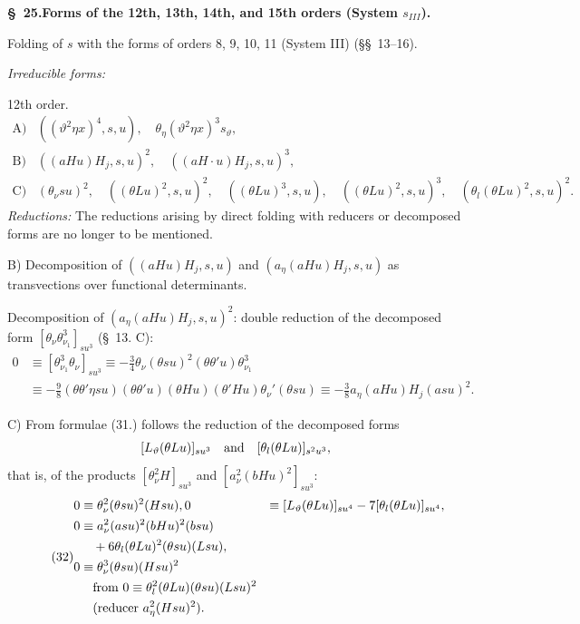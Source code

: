 \documentclass[11pt]{article}
\begin{document}
\begin{center}\textbf{\S\ 25.\quad Forms of the 12th, 13th, 14th, and 15th orders (System $s_{III}$).}\end{center}
Folding of $s$ with the forms of orders 8, 9, 10, 11 (System III) (\S\S\ 13--16).

\noindent\emph{Irreducible forms:}

\noindent 12th order.
\[
\begin{array}{rl}
\text{A)}& ((\vartheta^2\eta x)^4,s,u),\quad \theta_\eta(\vartheta^2\eta x)^3s_\vartheta,\\
\text{B)}& ((aHu)H_j,s,u)^2,
\quad ((aH\cdot u)H_j,s,u)^3,\\
\text{C)}& (\theta_\nu su)^2,
\quad ((\theta Lu)^2,s,u)^2,
\quad ((\theta Lu)^3,s,u),
\quad ((\theta Lu)^2,s,u)^3,
\quad (\theta_l(\theta Lu)^2,s,u)^2.
\end{array}
\]
\noindent\emph{Reductions:} The reductions arising by direct folding with reducers or decomposed forms are no longer to be mentioned.

B) Decomposition of $((aHu)H_j,s,u)$ and $(a_\eta(aHu)H_j,s,u)$ as transvections over functional determinants.

Decomposition of $(a_\eta(aHu)H_j,s,u)^2$: double reduction of the decomposed form $[\theta_\nu\theta_{\nu_1}^3]_{su^3}$ (\S\ 13. C):
\begin{align*}
0&\equiv[\theta_{\nu_1}^3\theta_\nu]_{su^3}
\equiv-\frac34\theta_\nu(\theta su)^2(\theta\theta'u)\theta_{\nu_1}^3\\
&\equiv-\frac98(\theta\theta'\eta su)(\theta\theta'u)(\theta Hu)(\theta'Hu)\theta_\nu'(\theta su)
\equiv-\frac38a_\eta(aHu)H_j(asu)^2.
\end{align*}

C) From formulae (31.) follows the reduction of the decomposed forms
\[
 [L_\vartheta(\theta Lu)]_{su^3}\quad\hbox{and}\quad [\theta_l(\theta Lu)]_{s^2u^3},
\]
that is, of the products $[\theta_\nu^2H]_{su^3}$ and $[a_\nu^2(bHu)^2]_{su^3}$:
\begin{equation}
\tag{32}
\begin{aligned}
0&\equiv\theta_\nu^2(\theta su)^2(Hsu),
0&\equiv [L_\vartheta(\theta Lu)]_{su^4}-7[\theta_l(\theta Lu)]_{su^4},\\
0&\equiv a_\nu^2(asu)^2(bHu)^2(bsu)\\
&\quad+6\theta_l(\theta Lu)^2(\theta su)(Lsu),\\
0&\equiv\theta_\nu^3(\theta su)(Hsu)^2\\
&\quad\hbox{from }0\equiv\theta_l^2(\theta Lu)(\theta su)(Lsu)^2\\
&\quad(\hbox{reducer }a_\eta^2(Hsu)^2).
\end{aligned}
\end{equation}
\end{document}
